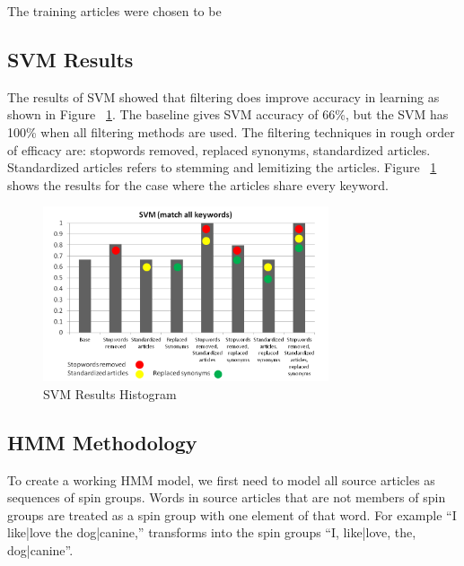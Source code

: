 \documentclass[11pt,letterpaper,oneside, titlepage]{scrartcl}
\begin{document}
The training articles were chosen to be 

\subsection{SVM Results}


The results of SVM showed that filtering does improve accuracy in learning as shown in Figure ~\ref{fig:svm}. The baseline gives SVM accuracy of 66\%, but the SVM has 100\% when all filtering methods are used. The filtering techniques in rough order of efficacy are: stopwords removed, replaced synonyms, standardized articles. Standardized articles refers to stemming and lemitizing the articles. Figure ~\ref{fig:svm} shows the results for the case where the articles share every keyword.


\begin{figure}[h!]
  \centering
  \includegraphics[width=0.75\textwidth]{svm_allmatches}
  \caption{SVM Results Histogram}
  \label{fig:svm}
\end{figure}

\clearpage

\subsection{HMM Methodology}

To create a working HMM model, we first need to model all source articles as sequences of spin groups. Words in source articles that are not members of spin groups are treated as a spin group with one element of that word. For example “I {like|love} the {dog|canine},” transforms into the spin groups “{I}, {like|love}, {the}, {dog|canine}”.
\end{document}
